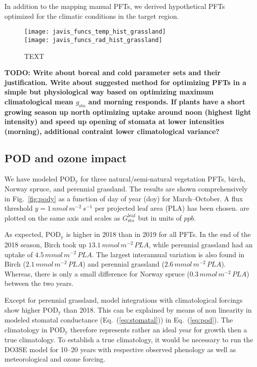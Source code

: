 \documentclass[bg, manuscript]{copernicus}
\begin{document}
In addition to the mapping manual PFTs, we derived hypothetical PFTs optimized for the climatic conditions in the target region.

\begin{figure}[t]
  \texttt{[image: javis\_funcs\_temp\_hist\_grassland]}\\
  \texttt{[image: javis\_funcs\_rad\_hist\_grassland]}
\caption{TEXT}
\label{fig:f_temp_grassland}
\end{figure}

{\bf TODO: Write about boreal and cold parameter sets and their justification. Write about suggested method for optimizing PFTs in a simple but physiological way based on optimizing maximum climatological mean $g_\mathrm{sto}$ and morning responds. If plants have a short growing season up north optimizing  uptake around noon (highest light intensity) and speed up opening of stomata at lower intensities (morning), additional contraint lower climatological variance?}


\subsection{POD and ozone impact}

We have modeled $\mathrm{POD_y}$ for three natural/semi-natural vegetation PFTs, birch, Norway spruce, and perennial grassland. The results are shown comprehensively in Fig.~\ref{fig:pody} as a function of day of year (doy) for March--October. A flux threshold $y=1\,\unit{nmol\,m^{-2}\,s^{-1}}$ per projected leaf area (PLA) has been chosen. \chem{[O_3]} are plotted on the same axis and scales as $G_\text{sto}^\text{leaf}$ but in units of $\unit{ppb}$.

As expected, $\mathrm{POD_y}$ is higher in 2018 than in 2019 for all PFTs. In the end of the 2018 season, Birch took up $13.1\,\unit{mmol\,m^{-2}\,PLA}$, while perennial grassland had an uptake of $4.5\,\unit{mmol\,m^{-2}\,PLA}$. The largest interannual variation is also found in Birch ($2.1\,\unit{mmol\,m^{-2}\,PLA}$) and perennial grassland ($2.6\,\unit{mmol\,m^{-2}\,PLA}$). Whereas, there is only a small difference for Norway spruce ($0.3\,\unit{mmol\,m^{-2}\,PLA}$) between the two years.

Except for perennial grassland, model integrations with climatological forcings show higher $\mathrm{POD_y}$ than 2018. This can be explained by means of non linearity in modeled stomatal conductance (Eq.~(\ref{eq:stomatal})) in Eq.~(\ref{eq:pod}). The climatology in $\mathrm{POD_y}$ therefore represents rather an ideal year for growth then a true climatology. To establish a true climatology, it would be necessary to run the DO3SE model for 10--20 years with respective observed phenology as well as meteorological and ozone forcing. 
\end{document}
